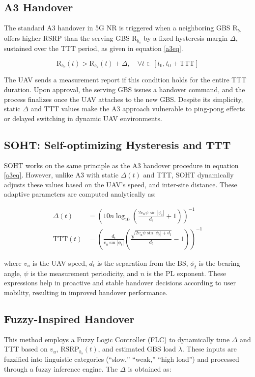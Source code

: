 \documentclass[conference]{IEEEtran}
\begin{document}
\subsection{A3 Handover}
The standard A3 handover in 5G NR is triggered when a neighboring GBS $\text{R}_{b_c}$ offers higher RSRP than the serving GBS $\text{R}_{b_s}$ by a fixed hysteresis margin $\Delta$, sustained over the TTT period, as given in equation \eqref{a3eq}. 

\begin{equation}
\label{a3eq}
\text{R}_{b_c}(t) > \text{R}_{b_s}(t) + \Delta, \quad \forall t \in [t_0, t_0 + \text{TTT}]
\end{equation}

The UAV sends a measurement report if this condition holds for the entire TTT duration. Upon approval, the serving GBS issues a handover command, and the process finalizes once the UAV attaches to the new GBS. Despite its simplicity, static $\Delta$ and TTT values make the A3 approach vulnerable to ping-pong effects or delayed switching in dynamic UAV environments.

\subsection{SOHT: Self-optimizing Hysteresis and TTT}
SOHT works on the same principle as the A3 handover procedure in equation \eqref{a3eq}. However, unlike A3 with static $\Delta(t)$ and TTT, SOHT dynamically adjusts these values based on the UAV's speed, and inter-site distance. These adaptive parameters are computed analytically as:

\begin{align}
\Delta(t) &= \left(10n \log_{10}\left(\frac{2v_u \psi \sin |\phi_t|}{d_t} + 1\right)\right)^{-1} \\
\mathrm{TTT}(t) &= \left(\frac{d_t}{v_u \sin |\phi_t|} \left(\frac{\sqrt{2v_u \psi \sin |\phi_t| + d_t}}{d_t} - 1\right)\right)^{-1}
\end{align}

where $v_u$ is the UAV speed, $d_t$ is the separation from the BS, $\phi_t$ is the bearing angle, $\psi$ is the measurement periodicity, and $n$ is the PL exponent. These expressions help in proactive and stable handover decisions according to user mobility, resulting in improved handover performance. 


\subsection{Fuzzy-Inspired Handover}
This method employs a Fuzzy Logic Controller (FLC) to dynamically tune $\Delta$ and TTT based on $v_u$, $\mathrm{RSRP}_{b_s}(t)$, and estimated GBS load $\lambda$. These inputs are fuzzified into linguistic categories (``slow,'' ``weak,'' ``high load'') and processed through a fuzzy inference engine. The $\Delta$ is obtained as:
\end{document}
